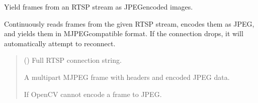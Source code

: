 \documentclass[letterpaper,10pt,english]{sphinxmanual}
\begin{document}
\begin{fulllineitems}
\label{\detokenize{modules/src.data_stream.StreamConversionServer:src.data_stream.StreamConversionServer.gen_frames}}
\pysigstartsignatures
\pysiglinewithargsret
{}
{}
{}
\pysigstopsignatures
\sphinxAtStartPar
Yield frames from an RTSP stream as JPEG\sphinxhyphen{}encoded images.

\sphinxAtStartPar
Continuously reads frames from the given RTSP stream, encodes them
as JPEG, and yields them in MJPEG\sphinxhyphen{}compatible format. If the connection
drops, it will automatically attempt to reconnect.
\begin{quote}\begin{description}
\sphinxAtStartPar
{} () \textendash{} Full RTSP connection string.

\sphinxAtStartPar
{} \textendash{} A multipart MJPEG frame with headers and encoded JPEG data.

\sphinxAtStartPar
{} \textendash{} If OpenCV cannot encode a frame to JPEG.

\end{description}\end{quote}

\end{fulllineitems}

\end{document}
